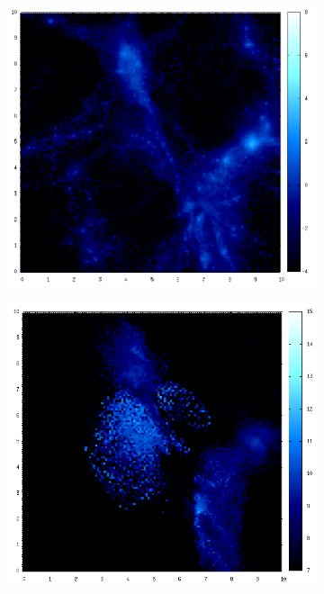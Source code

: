 \documentclass[journal]{IEEEtran}
\begin{document}
\begin{figure}[h!]
\begin{subfigure}[t]{0.25\textwidth}
	\end{subfigure}
	\quad
	\begin{subfigure}[t]{0.25\textwidth}
		\centering
		\includegraphics[width=\linewidth]{GAS01-02.png}
	\end{subfigure}
	\quad
	\begin{subfigure}[t]{0.25\textwidth}
		\centering
		\includegraphics[width=\linewidth]{TEMP01-02.png}

\end{subfigure}
\end{figure}
\end{document}
